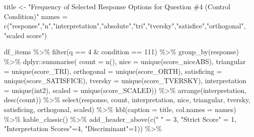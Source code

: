 \documentclass[
  letterpaper,
  DIV=11,
  numbers=noendperiod]{scrreprt}
\newenvironment{Shaded}{\begin{snugshade}}{\end{snugshade}}
\newcommand{\AttributeTok}[1]{\textcolor[rgb]{0.40,0.45,0.13}{#1}}
\newcommand{\DecValTok}[1]{\textcolor[rgb]{0.68,0.00,0.00}{#1}}
\newcommand{\FunctionTok}[1]{\textcolor[rgb]{0.28,0.35,0.67}{#1}}
\newcommand{\NormalTok}[1]{\textcolor[rgb]{0.00,0.23,0.31}{#1}}
\newcommand{\OtherTok}[1]{\textcolor[rgb]{0.00,0.23,0.31}{#1}}
\newcommand{\SpecialCharTok}[1]{\textcolor[rgb]{0.37,0.37,0.37}{#1}}
\newcommand{\StringTok}[1]{\textcolor[rgb]{0.13,0.47,0.30}{#1}}
\begin{document}
\begin{Shaded}
\begin{Highlighting}[]
\NormalTok{title }\OtherTok{\textless{}{-}} \StringTok{"Frequency of Selected Response Options for Question \#4 (Control Condition)"}
\NormalTok{names }\OtherTok{=} \FunctionTok{c}\NormalTok{(}\StringTok{"response"}\NormalTok{,}\StringTok{"n"}\NormalTok{,}\StringTok{"interpretation"}\NormalTok{,}\StringTok{"absolute"}\NormalTok{,}\StringTok{"tri"}\NormalTok{,}\StringTok{"tversky"}\NormalTok{,}\StringTok{"satisfice"}\NormalTok{,}\StringTok{"orthogonal"}\NormalTok{, }\StringTok{"scaled score"}\NormalTok{)}

\NormalTok{df\_items }\SpecialCharTok{\%\textgreater{}\%} \FunctionTok{filter}\NormalTok{(q }\SpecialCharTok{==} \DecValTok{4} \SpecialCharTok{\&}\NormalTok{ condition }\SpecialCharTok{==} \DecValTok{111}\NormalTok{) }\SpecialCharTok{\%\textgreater{}\%} \FunctionTok{group\_by}\NormalTok{(response) }\SpecialCharTok{\%\textgreater{}\%} 
\NormalTok{  dplyr}\SpecialCharTok{::}\FunctionTok{summarise}\NormalTok{( }\AttributeTok{count =} \FunctionTok{n}\NormalTok{(), }
                    \AttributeTok{nice =} \FunctionTok{unique}\NormalTok{(score\_niceABS),}
                    \AttributeTok{triangular =} \FunctionTok{unique}\NormalTok{(score\_TRI), }
                    \AttributeTok{orthogonal =}  \FunctionTok{unique}\NormalTok{(score\_ORTH),}
                    \AttributeTok{satisficing =}  \FunctionTok{unique}\NormalTok{(score\_SATISFICE),}
                    \AttributeTok{tversky =} \FunctionTok{unique}\NormalTok{(score\_TVERSKY),}
                    \AttributeTok{interpretation =} \FunctionTok{unique}\NormalTok{(int2),}
                    \AttributeTok{scaled =} \FunctionTok{unique}\NormalTok{(score\_SCALED)) }\SpecialCharTok{\%\textgreater{}\%} 
  \FunctionTok{arrange}\NormalTok{(interpretation, }\FunctionTok{desc}\NormalTok{(count)) }\SpecialCharTok{\%\textgreater{}\%} 
  \FunctionTok{select}\NormalTok{(response, count, interpretation, nice, }
\NormalTok{         triangular, tversky, satisficing, orthogonal, scaled) }\SpecialCharTok{\%\textgreater{}\%} 
  \FunctionTok{kbl}\NormalTok{(}\AttributeTok{caption =}\NormalTok{ title, }\AttributeTok{col.names =}\NormalTok{ names) }\SpecialCharTok{\%\textgreater{}\%}  \FunctionTok{kable\_classic}\NormalTok{() }\SpecialCharTok{\%\textgreater{}\%} 
  \FunctionTok{add\_header\_above}\NormalTok{(}\FunctionTok{c}\NormalTok{(}\StringTok{" "} \OtherTok{=} \DecValTok{3}\NormalTok{, }\StringTok{"Strict Score"} \OtherTok{=} \DecValTok{1}\NormalTok{, }\StringTok{"Interpretation Scores"}\OtherTok{=}\DecValTok{4}\NormalTok{, }\StringTok{"Discriminant"}\OtherTok{=}\DecValTok{1}\NormalTok{)) }\SpecialCharTok{\%\textgreater{}\%}

\end{Highlighting}
\end{Shaded}
\end{document}
